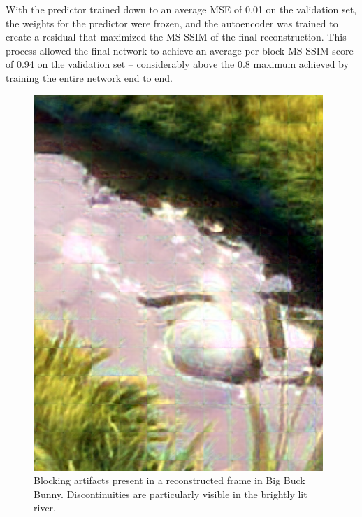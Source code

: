 \documentclass[10pt,twocolumn,letterpaper]{article}
\begin{document}
With the predictor trained down to an average MSE of 0.01 on the validation set, the weights for the predictor were frozen, and the autoencoder was trained to create a residual that maximized the MS-SSIM of the final reconstruction. This process allowed the final network to achieve an average per-block MS-SSIM score of 0.94 on the validation set -- considerably above the 0.8 maximum achieved by training the entire network end to end.

\begin{figure}[t]
\begin{center}
  \includegraphics[width=0.4\linewidth]{block}
\end{center}
   \caption{Blocking artifacts present in a reconstructed frame in Big Buck Bunny. Discontinuities are particularly visible in the brightly lit river.}
   \label{fig:block}
\end{figure}
\end{document}
